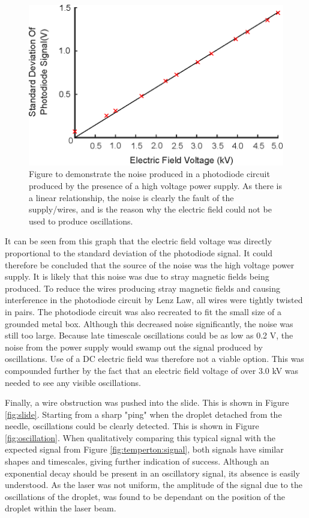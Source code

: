 \documentclass{physics_article_B}
\begin{document}
        \begin{figure}[H]
            \centering
            \includegraphics{Figures/ElecFieldNoise.eps}
            \caption{Figure to demonstrate the noise produced in a photodiode circuit produced by the presence of a high voltage power supply. As there is a linear relationship, the noise is clearly the fault of the supply/wires, and is the reason why the electric field could not be used to produce oscillations.} 	
            \label{fig:control}
        \end{figure} 
        
        It can be seen from this graph that the electric field voltage was directly proportional to the standard deviation of the photodiode signal. It could therefore be concluded that the source of the noise was the high voltage power supply. It is likely that this noise was due to stray magnetic fields being produced. To reduce the wires producing stray magnetic fields and causing interference in the photodiode circuit by Lenz Law, all wires were tightly twisted in pairs. The photodiode circuit was also recreated to fit the small size of a grounded metal box. Although this decreased noise significantly, the noise was still too large.        Because late timescale oscillations could be as low as 0.2 V, the noise from the power supply would swamp out the signal produced by oscillations. Use of a DC electric field was therefore not a viable option. This was compounded further by the fact that an electric field voltage of over 3.0 kV was needed to see any visible oscillations. 
        
        Finally, a wire obstruction was pushed into the slide. This is shown in Figure \ref{fig:slide}. Starting from a sharp "ping" when the droplet detached from the needle, oscillations could be clearly detected. This is shown in Figure \ref{fig:oscillation}. When qualitatively comparing this typical signal with the expected signal from Figure \ref{fig:temperton:signal}, both signals have similar shapes and timescales, giving further indication of success. Although an exponential decay should be present in an oscillatory signal, its absence is easily understood. As the laser was not uniform, the amplitude of the signal due to the oscillations of the droplet, was found to be dependant on the position of the droplet within the laser beam. 
        
\end{document}
